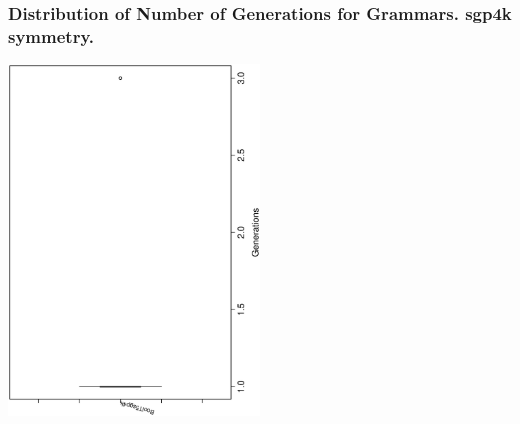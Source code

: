  \begin{frame}
 \frametitle{ Distribution of Number of Generations for Grammars. sgp4k  symmetry. }
 \begin{center}
\includegraphics[width=0.5\textwidth, angle=-90]
{ExpFboxplottGenerations002.eps}
 \end{center}
 \label{ExpFboxplottGenerations002.eps}  
 \end{frame}

